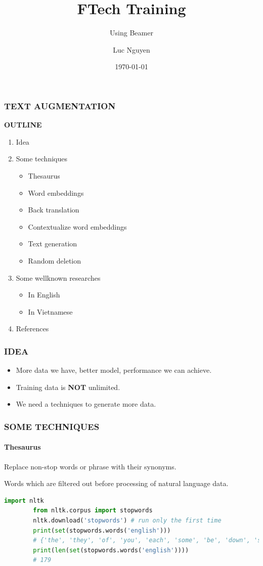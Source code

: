 \documentclass[10pt]{beamer}
\title{FTech Training}
\subtitle{Using Beamer}
\author{Luc Nguyen}
\institute{HUST}
\date{\today}
\begin{document}
\begin{frame}
    \frametitle{\textbf{TEXT AUGMENTATION}}
    \Large{\textbf{OUTLINE}}
    \begin{enumerate}
        \item Idea
        \item Some techniques
        \begin{itemize}
            \item Thesaurus
            \item Word embeddings
            \item Back translation
            \item Contextualize word embeddings
            \item Text generation
            \item Random deletion
        \end{itemize}
        \item Some wellknown researches
        \begin{itemize}
            \item In English
            \item In Vietnamese
        \end{itemize}
        \item References %
    \end{enumerate}
\end{frame}
\begin{frame}
    \frametitle{\textbf{IDEA}}
    \begin{itemize}
        \item More data we have, better model, performance we can achieve.
        \item Training data is \textbf{NOT} unlimited.
        \item We need a techniques to generate more data.
    \end{itemize}
\end{frame}
\begin{frame}[fragile]
    \frametitle{\textbf{SOME TECHNIQUES}}
    \framesubtitle{\textbf{Thesaurus}}
    \begin{definition}[Thesaurus]
        Replace non-stop words or phrase with their synonyms.
    \end{definition}\pause
    \begin{definition}
        Words which are filtered out before processing of natural language data.
    \end{definition}\pause
    \begin{lstlisting}[language=Python, caption=Stop words in English ]
        import nltk
        from nltk.corpus import stopwords
        nltk.download('stopwords') # run only the first time
        print(set(stopwords.words('english')))
        # {'the', 'they', 'of', 'you', 'each', 'some', 'be', 'down', 's', 're', 'between', 'we', "mustn't", 'so', ... }
        print(len(set(stopwords.words('english'))))
        # 179
    \end{lstlisting}
\end{frame}
\end{document}
